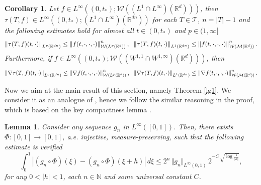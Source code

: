 \documentclass[10pt]{article}
\newtheorem{lemma}{Lemma}
\newtheorem{coro}{Corollary}
\newcommand{\hd}{\hspace{0.2cm}}
\newcommand*{\norm}[1]{\left\Vert{#1}\right\Vert}
\newcommand{\R}{\mathbb{R}}
\newcommand{\Tree}{\mathcal{T}}
\newcommand{\W}{\mathcal{W}}
\begin{document}
\begin{coro}\label{tauest}
Let $f\in L^\infty((0,t_{*});\W((L^1\cap L^{\infty})(\R^d)))$, then   $\tau(T,f) \in L^{\infty}((0,t_{*});(L^{1}\cap L^{\infty})(\R^{dn}))$ for each $T \in \Tree$, $n=|T|-1$ and the following estimates hold for almost all $t \in (0,t_{*})$ and $p\in(1,\infty]$
\[
\norm{\tau(T,f)(t,\cdot)}_{L^{p}(\R^{dn})} \leq \norm{f(t,\cdot,\cdot,\cdot)}^n_{\W( L^p(\R^d))}, \hd \norm{\tau(T,f)(t,\cdot)}_{L^{1}(\R^{dn})} \leq \norm{f(t,\cdot,\cdot,\cdot)}^n_{\W( \mathcal{M}(\R^d))}.
\]
Furthermore, if $f\in L^\infty((0,t_{*});\W((W^{1,1}\cap W^{1,\infty})(\R^d)))$, then
\[
\norm{\nabla \tau(T,f)(t,\cdot)}_{L^{p}(\R^{dn})} \leq \norm{\nabla f(t,\cdot,\cdot,\cdot)}^n_{\W( L^p(\R^d))}, \hd \norm{\nabla \tau(T,f)(t,\cdot)}_{L^{1}(\R^{dn})} \leq \norm{\nabla f(t,\cdot,\cdot,\cdot)}^n_{\W( \mathcal{M}(\R^d))}.
\]
\end{coro}







Now we aim at the main result of this section, namely Theorem \ref{lg1}. We consider it as an analogue of \cite[Theorem 5.1]{JPS2025}, hence we follow the similar reasoning in the proof, which is based on the key compactness lemma \cite[Lemma 5.7, Corollary 5.9]{JPS2025}.


\begin{lemma}\cite[Corollary 5.9]{JPS2025}\label{lg}
Consider any sequence $g_n$ in $L^\infty([0, 1])$. Then, there exists $\Phi: [0, 1]\to [0, 1]$, {\it a.e.} injective, measure-preserving, such that the following estimate is verified
      \[
\int_0^{1} |(g_n\circ\Phi)(\xi)-(g_n\circ\Phi)(\xi+h)|\,d\xi\leq 2^n\,\Vert g_n\Vert_{L^\infty(0,1)}\,2^{-C\,\sqrt{\log\frac{1}{\vert h\vert}}},
      \]
for any $0<\vert h\vert <1$, each $n\in \mathbb{N}$ and some universal constant $C$.
\end{lemma}
\end{document}
